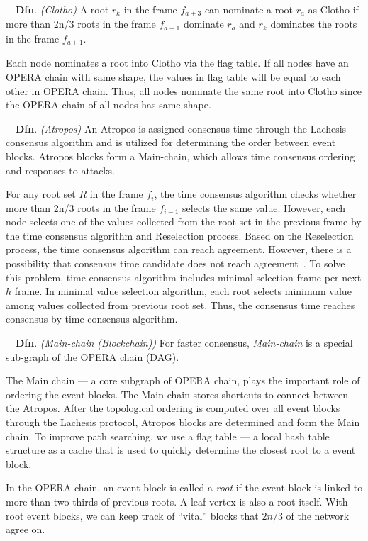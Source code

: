 \documentclass{article}
\newcommand{\dfnn}[2]{$\quad$\textbf{Dfn}. \emph{(#1)} {#2}}
\begin{document}
\dfnn{Clotho}{A root $r_k$ in the frame $f_{a+3}$ can nominate a root $r_a$ as Clotho if more than 2n/3 roots in the frame $f_{a+1}$ dominate $r_a$ and $r_k$ dominates the roots in the frame $f_{a+1}$.}

Each node nominates a root into Clotho via the flag table. If all nodes have an OPERA chain with same shape, the values in flag table will be equal to each other in OPERA chain. Thus, all nodes nominate the same root into Clotho since the OPERA chain of all nodes has same shape.

\dfnn{Atropos}{An Atropos is assigned consensus time through the Lachesis consensus algorithm and is utilized for determining the order between event blocks. Atropos blocks form a Main-chain, which allows time consensus ordering and responses to attacks.}

For any root set $R$ in the frame $f_{i}$, the time consensus algorithm checks whether more than 2n/3 roots in the frame $f_{i-1}$ selects the same value. However, each node selects one of the values collected from the root set in the previous frame by the time consensus algorithm and Reselection process. Based on the Reselection process, the time consensus algorithm can reach agreement. However, there is a possibility that consensus time candidate does not reach agreement~\cite{Fischer85}. To solve this problem, time consensus algorithm includes minimal selection frame per next $h$ frame. In minimal value selection algorithm, each root selects minimum value among values collected from previous root set. Thus, the consensus time reaches consensus by time consensus algorithm.

\dfnn{Main-chain (Blockchain)}{For faster consensus, \emph{Main-chain} is a special sub-graph of the OPERA chain (DAG).}

The Main chain --- a core subgraph of OPERA chain, plays the important role of ordering the event blocks. The Main chain stores shortcuts to connect between the Atropos. 
After the topological ordering is computed over all event blocks through the Lachesis protocol, Atropos blocks are determined and form the Main chain.  To improve path searching, we use a flag table --- a local hash table structure as a cache that is used to quickly determine the closest root to a event block.

In the OPERA chain, an event block is called a \emph{root} if the event block is linked to more than two-thirds of previous roots. A leaf vertex is also a root itself. With root event blocks, we can keep track of ``vital'' blocks that $2n/3$ of the network agree on.  
\end{document}
